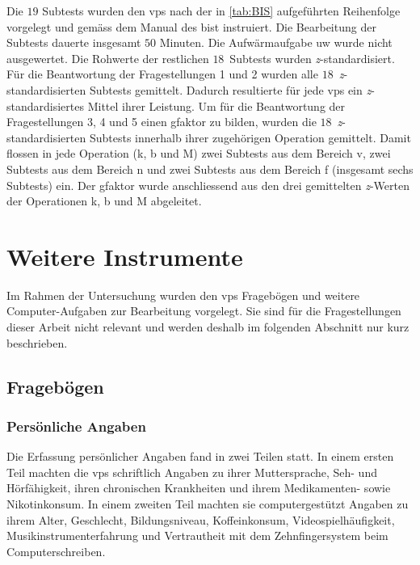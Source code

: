 \documentclass[11pt, twoside, a4paper]{book}		%
\begin{document}
Die $19$ Subtests wurden den \glspl{vp} nach der in \autoref{tab:BIS} aufgeführten Reihenfolge vorgelegt und gemäss dem Manual des \gls{bist} instruiert. 
Die Bearbeitung der Subtests dauerte insgesamt $50$ Minuten.
Die Aufwärmaufgabe \gls{uw} wurde nicht ausgewertet. Die Rohwerte der restlichen $18$~Subtests wurden \textit{z}-standardisiert. 
Für die Beantwortung der Fragestellungen 1 und 2 wurden alle $18$~\textit{z}-stand\-ard\-isier\-ten Subtests gemittelt. Dadurch resultierte für jede \glspl{vp} ein \textit{z}-standardisiertes Mittel ihrer Leistung. 
Um für die Beantwortung der Fragestellungen 3, 4 und 5 einen \gls{gfaktor} zu bilden, wurden die $18$~\textit{z}-standardisierten Subtests innerhalb ihrer zugehörigen Operation gemittelt. Damit flossen in jede Operation (\gls{k}, \gls{b} und \gls{M}) zwei Subtests aus dem Bereich \gls{v}, zwei Subtests aus dem Bereich \gls{n} und zwei Subtests aus dem Bereich \gls{f} (insgesamt sechs Subtests) ein. Der \gls{gfaktor} wurde anschliessend aus den drei gemittelten \textit{z}-Werten der Operationen \gls{k}, \gls{b} und \gls{M} abgeleitet.


\section{Weitere Instrumente}

Im Rahmen der Untersuchung wurden den \glspl{vp} Fragebögen und weitere Com\-put\-er-Auf\-gaben zur Bearbeitung vorgelegt. Sie sind für die Fragestellungen dieser Arbeit nicht relevant und werden deshalb im folgenden Abschnitt nur kurz beschrieben.


\subsection{Fragebögen}

\subsubsection*{Persönliche Angaben}
Die Erfassung persönlicher Angaben fand in zwei Teilen statt. In einem ersten Teil machten die \glspl{vp} schriftlich Angaben zu ihrer Muttersprache, Seh- und Hörfähigkeit, ihren chronischen Krankheiten und ihrem Medikamenten- sowie Nikotinkonsum. In einem zweiten Teil machten sie computergestützt Angaben zu ihrem Alter, Geschlecht, Bildungsniveau, Koffeinkonsum,  Videospielhäufigkeit, Musikinstrumenterfahrung und Vertrautheit mit dem Zehnfingersystem beim Computerschreiben.
\end{document}
